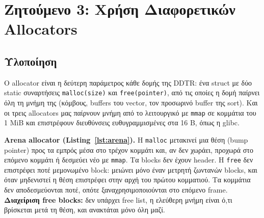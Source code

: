 \documentclass[11pt,a4paper]{article}
\newcommand{\en}[1]{\textlatin{#1}}
\begin{document}
\section{Ζητούμενο 3: Χρήση Διαφορετικών \en{Allocators}}
\label{sec:q3}
\subsection{Υλοποίηση}
Ο \en{allocator} είναι η δεύτερη παράμετρος κάθε δομής της \en{DDTR}: ένα \en{struct} με δύο \en{static} συναρτήσεις \en{\texttt{malloc(size)}} και \en{\texttt{free(pointer)}}, από τις οποίες η δομή παίρνει όλη τη μνήμη της (κόμβους, \en{buffers} του \en{vector}, τον προσωρινό \en{buffer} της \en{sort}). Και οι τρεις \en{allocators} μας παίρνουν μνήμη από το λειτουργικό με \en{\texttt{mmap}} σε κομμάτια του 1 \en{MiB} και επιστρέφουν διευθύνσεις ευθυγραμμισμένες στα 16 \en{B}, όπως η \en{glibc}.

\textbf{\en{Arena allocator} (\en{Listing}~\ref{lst:arena}).} Η \en{\texttt{malloc}} μετακινεί μια θέση (\en{bump pointer}) προς τα εμπρός μέσα στο τρέχον κομμάτι και, αν δεν χωράει, προχωρά στο επόμενο κομμάτι ή δεσμεύει νέο με \en{\texttt{mmap}}. Τα \en{blocks} δεν έχουν \en{header}. Η \en{\texttt{free}} δεν επιστρέφει ποτέ μεμονωμένο \en{block}: μειώνει μόνο έναν μετρητή ζωντανών \en{blocks}, και όταν μηδενιστεί η θέση επιστρέφει στην αρχή του πρώτου κομματιού. Τα κομμάτια δεν αποδεσμεύονται ποτέ, οπότε ξαναχρησιμοποιούνται στο επόμενο \en{frame}. \textbf{Διαχείριση \en{free blocks}:} δεν υπάρχει \en{free list}, η ελεύθερη μνήμη είναι ό,τι βρίσκεται μετά τη θέση, και ανακτάται μόνο όλη μαζί.
\end{document}
